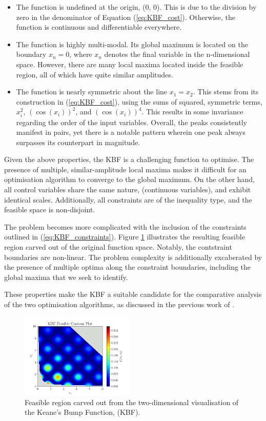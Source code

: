 \documentclass[10pt]{article}
\begin{document}
\begin{multicols}{2}
\begin{itemize}
    \item The function is undefined at the origin, (0, 0). This is due to the division by zero in the denominator of Equation (\ref{eq:KBF_cost}). Otherwise, the function is continuous and differentiable everywhere.
    \item The function is highly multi-modal. Its global maximum is located on the boundary $x_{n}=0$, where $x_n$ denotes the final variable in the n-dimensional space. However, there are many local maxima located inside the feasible region, all of which have quite similar amplitudes.
    \item The function is nearly symmetric about the line $x_1=x_2$. This stems from its construction in (\ref{eq:KBF_cost}), using the sums of squared, symmetric terms, $x_i^2$, $(\cos(x_i))^2$, and $(\cos(x_i))^4$. This results in some invariance regarding the order of the input variables. Overall, the peaks consistently manifest in pairs, yet there is a notable pattern wherein one peak always surpasses its counterpart in magnitude.
\end{itemize}

Given the above properties, the KBF is a challenging function to optimise. The presence of multiple, similar-amplitude local maxima makes it difficult for an optimisation algorithm to converge to the global maximum. On the other hand, all control variables share the same nature, (continuous variables), and exhibit identical scales. Additionally, all constraints are of the inequality type, and the feasible space is non-disjoint.

The problem becomes more complicated with the inclusion of the constraints outlined in (\ref{eq:KBF_constraints}). Figure \ref{fig:KBF_Feasible} illustrates the resulting feasible region carved out of the original function space. Notably, the contstraint boundaries are non-linear. The problem complexity is additionally excaberated by the presence of multiple optima along the constraint boundaries, including the global maxima that we seek to identify.

These properties make the KBF a suitable candidate for the comparative analysis of the two optimisation algorithms, as discussed in the previous work of \cite{ELBELTAGY1999639}.

\begin{figure}[H]
    \centering
    \includegraphics[width=0.48\textwidth]{../figures/KBF/KBF Feasible_contour.png}
    \captionsetup{justification=centering}
    \caption{Feasible region carved out from the two-dimensional visualisation of the Keane's Bump Function, (KBF).}
    \label{fig:KBF_Feasible}
\end{figure}


\end{multicols}
\end{document}
